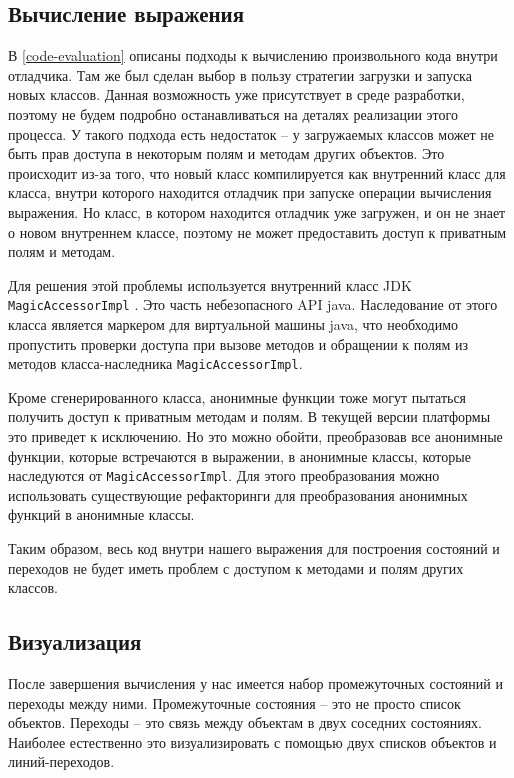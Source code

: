\subsection{Вычисление выражения}
В \ref{code-evaluation} описаны подходы к вычислению произвольного кода внутри отладчика. Там же был сделан выбор в пользу стратегии загрузки и запуска новых классов. Данная возможность уже присутствует в среде разработки, поэтому не будем подробно останавливаться на деталях реализации этого процесса. У такого подхода есть недостаток -- у загружаемых классов может не быть прав доступа в некоторым полям и методам других объектов. Это происходит из-за того, что новый класс компилируется как внутренний класс для класса, внутри которого находится отладчик при запуске операции вычисления выражения. Но класс, в котором находится отладчик уже загружен, и он не знает о новом внутреннем классе, поэтому не может предоставить доступ к приватным полям и методам.

Для решения этой проблемы используется внутренний класс JDK \\ \texttt{MagicAccessorImpl} \cite{magic}. Это часть небезопасного API java. Наследование от этого класса является маркером для виртуальной машины java, что необходимо пропустить проверки доступа при вызове методов и обращении к полям из методов класса-наследника \texttt{MagicAccessorImpl}.

Кроме сгенерированного класса, анонимные функции тоже могут пытаться получить доступ к приватным методам и полям. В текущей версии платформы это приведет к исключению. Но это можно обойти, преобразовав все анонимные функции, которые встречаются в выражении, в анонимные классы, которые наследуются от \texttt{MagicAccessorImpl}. Для этого преобразования можно использовать существующие рефакторинги для преобразования анонимных функций в анонимные классы.

Таким образом, весь код внутри нашего выражения для построения состояний и переходов не будет иметь проблем с доступом к методами и полям других классов.

\subsection{Визуализация}
После завершения вычисления у нас имеется набор промежуточных состояний и переходы между ними. Промежуточные состояния -- это не просто список объектов. Переходы -- это связь между объектам в двух соседних состояниях. Наиболее естественно это визуализировать с помощью двух списков объектов и линий-переходов.

